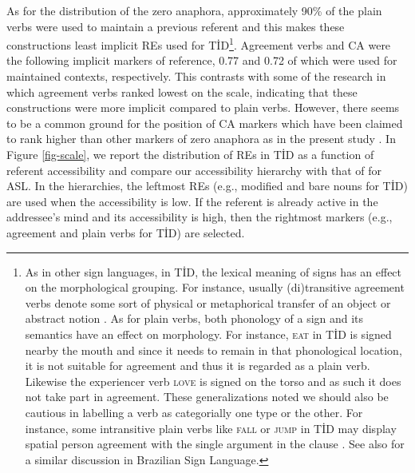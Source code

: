 \documentclass[review]{elsarticle} %
\begin{document}
As for the distribution of the zero anaphora, approximately 90\% of the
plain verbs were used to maintain a previous referent and this makes
these constructions least implicit REs used for TİD\footnote{As in other
  sign languages, in TİD, the lexical meaning of signs has an effect on
  the morphological grouping. For instance, usually (di)transitive
  agreement verbs denote some sort of physical or metaphorical transfer
  of an object or abstract notion \citep{meir1999}. As for plain verbs,
  both phonology of a sign and its semantics have an effect on
  morphology. For instance, \textsc{eat} in TİD is signed nearby the
  mouth and since it needs to remain in that phonological location, it
  is not suitable for agreement and thus it is regarded as a plain verb.
  Likewise the experiencer verb \textsc{love} is signed on the torso and
  as such it does not take part in agreement. These generalizations
  noted we should also be cautious in labelling a verb as categorially
  one type or the other. For instance, some intransitive plain verbs
  like \textsc{fall} or \textsc{jump} in TİD may display spatial person
  agreement with the single argument in the clause \citep{gokgoz2020}.
  See \citet{lourenço2018} also for a similar discussion in Brazilian
  Sign Language.}. Agreement verbs and CA were the following implicit
markers of reference, 0.77 and 0.72 of which were used for maintained
contexts, respectively. This contrasts with some of the research
\citep{czubek2017} in which agreement verbs ranked lowest on the scale,
indicating that these constructions were more implicit compared to plain
verbs. However, there seems to be a common ground for the position of CA
markers which have been claimed to rank higher than other markers of
zero anaphora as in the present study
\citep{frederiksen2016, czubek2017, barbera2009}. In Figure
\ref{fig-scale}, we report the distribution of REs in TİD as a function
of referent accessibility and compare our accessibility hierarchy with
that of \citep{frederiksen2016} for ASL. In the hierarchies, the
leftmost REs (e.g., modified and bare nouns for TİD) are used when the
accessibility is low. If the referent is already active in the
addressee's mind and its accessibility is high, then the rightmost
markers (e.g., agreement and plain verbs for TİD) are selected.
\end{document}
